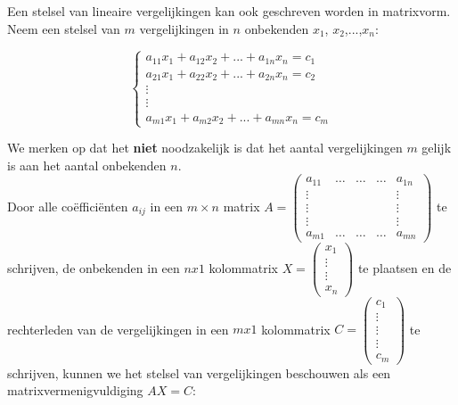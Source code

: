 Een stelsel van lineaire vergelijkingen kan ook geschreven worden in matrixvorm. Neem een stelsel van $m$ vergelijkingen in $n$ onbekenden $x_1$, $x_2$,...,$x_n$:

\[ 
\left\{ \begin{array}{l}
a_{11} x_1 + a_{12} x_2 + ... + a_{1n} x_n = c_1 \\
a_{21} x_1 + a_{22} x_2 + ... + a_{2n} x_n = c_2 \\
\vdots \\ \vdots \\
a_{m1} x_1 + a_{m2} x_2 + ... + a_{mn} x_n = c_m
\end{array}
\right.
\]

We merken op dat het {\bf niet} noodzakelijk is dat het aantal vergelijkingen $m$ gelijk is aan het aantal onbekenden $n$.\\

Door alle co\"{e}ffici\"{e}nten $a_{ij}$ in een $m \times n$ matrix $A=\left( \begin{matrix} a_{11} & \ldots & \ldots & \ldots & a_{1n} \\ \vdots & & & & \vdots \\ \vdots & & & & \vdots \\ \vdots & & & & \vdots \\ a_{m1} & \ldots & \ldots & \ldots & a_{mn} \end{matrix} \right) $ te schrijven, de onbekenden in een $nx1$ kolommatrix $X=\left( \begin{matrix} x_1 \\ \vdots \\ \vdots \\ x_n \end{matrix} \right) $ te plaatsen en de rechterleden van de vergelijkingen in een $mx1$ kolommatrix $C=\left( \begin{matrix} c_1 \\ \vdots \\ \vdots \\ \vdots \\ c_m \end{matrix} \right) $ te schrijven, kunnen we het stelsel van vergelijkingen beschouwen als een matrixvermenigvuldiging $AX=C$:

